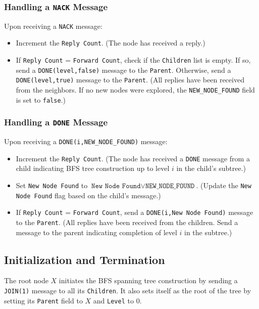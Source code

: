 \subsubsection{Handling a \texttt{NACK} Message}
Upon receiving a \texttt{NACK} message:
\begin{itemize}
    \item Increment the \texttt{Reply Count}. (The node has received a reply.)
    \item If \texttt{Reply Count} = \texttt{Forward Count}, check if the \texttt{Children} list is empty. If so, send a \texttt{DONE(level,false)} message to the \texttt{Parent}. Otherwise, send a \texttt{DONE(level,true)} message to the \texttt{Parent}. (All replies have been received from the neighbors. If no new nodes were explored, the \texttt{NEW\_NODE\_FOUND} field is set to \texttt{false}.)
\end{itemize}

\subsubsection{Handling a \texttt{DONE} Message}
Upon receiving a \texttt{DONE(i,NEW\_NODE\_FOUND)} message:
\begin{itemize}
    \item Increment the \texttt{Reply Count}. (The node has received a \texttt{DONE} message from a child indicating BFS tree construction up to level \( i \) in the child's subtree.)
    \item Set \texttt{New Node Found} to \( \texttt{New Node Found} \vee \texttt{NEW\_NODE\_FOUND} \). (Update the \texttt{New Node Found} flag based on the child's message.)
    \item If \texttt{Reply Count} = \texttt{Forward Count}, send a \texttt{DONE(i,New Node Found)} message to the \texttt{Parent}. (All replies have been received from the children. Send a message to the parent indicating completion of level \( i \) in the subtree.)
\end{itemize}


\subsection{Initialization and Termination}
The root node \( X \) initiates the BFS spanning tree construction by sending a \texttt{JOIN(1)} message to all its \texttt{Children}. It also sets itself as the root of the tree by setting its \texttt{Parent} field to \(X\) and \texttt{Level} to \(0\).

